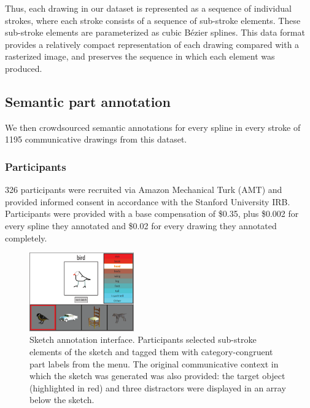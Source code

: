 \documentclass[10pt,letterpaper]{article}
\begin{document}
Thus, each drawing in our dataset is represented as a sequence of individual strokes, where each stroke consists of a sequence of sub-stroke elements.
These sub-stroke elements are parameterized as cubic Bézier splines.
This data format provides a relatively compact representation of each drawing compared with a rasterized image, and preserves the sequence in which each element was produced. 

\subsection{Semantic part annotation}

We then crowdsourced semantic annotations for every spline in every stroke of 1195 communicative drawings from this dataset. 

\subsubsection{Participants}
326 participants were recruited via Amazon Mechanical Turk (AMT) and provided informed consent in accordance with the Stanford University IRB. 
Participants were provided with a base compensation of \$0.35, plus \$0.002 for every spline they annotated and \$0.02 for every drawing they annotated completely. 


\begin{figure}[htbp]
\centering
\includegraphics[width=0.4\textwidth]{figures/4_annotation_interface.pdf}
\caption{Sketch annotation interface. Participants selected sub-stroke elements of the sketch and tagged them with category-congruent part labels from the menu. The original communicative context in which the sketch was generated was also provided: the target object (highlighted in red) and three distractors were displayed in an array below the sketch.}
\label{annotation_interface}
\end{figure}
\end{document}

